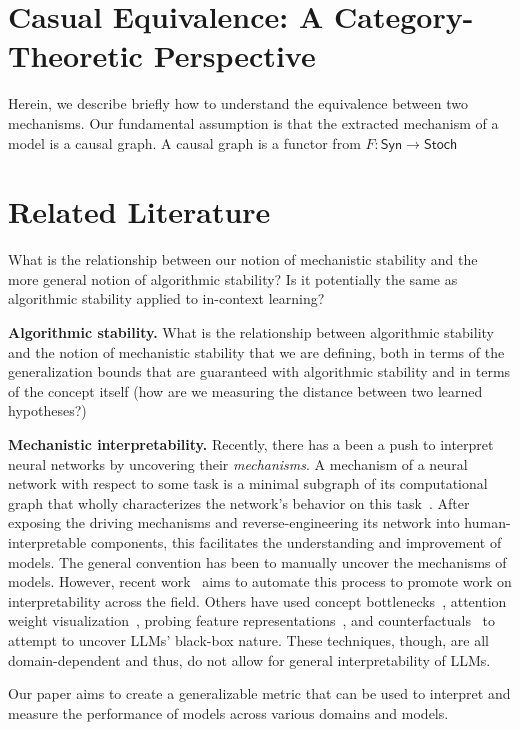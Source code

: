 \documentclass[10pt]{article}
\begin{document}
\section{Casual Equivalence: A Category-Theoretic Perspective}
Herein, we describe briefly how to understand the equivalence between two mechanisms.
Our fundamental assumption is that the extracted mechanism of a model is 
a causal graph.
A causal graph is a functor from $F: \textsf{Syn} \to \textsf{Stoch}$


\section{Related Literature}
What is the relationship between our notion of mechanistic stability and 
the more general notion of algorithmic stability? Is it potentially the same
as algorithmic stability applied to in-context learning?

\textbf{Algorithmic stability.} What is the relationship between algorithmic
stability and the notion of mechanistic stability that we are defining, both
in terms of the generalization bounds that are guaranteed with algorithmic
stability and in terms of the concept itself (how are we measuring
the distance between two learned hypotheses?)

\textbf{Mechanistic interpretability.} Recently, there has a been a push to interpret
neural networks by uncovering their
\textit{mechanisms}. A mechanism of a neural network with respect to some task
is a minimal subgraph of its computational graph that wholly characterizes the
network's behavior on this task~\citep{wang_interpretability_2022}. After exposing
the driving mechanisms and reverse-engineering its network into human-interpretable
components, this facilitates the understanding and improvement of models.  The general
convention has been to manually uncover the mechanisms of models. However, recent work~\citep{conmy_towards_2023}
aims to automate this process to promote work on interpretability across the field. Others 
have used concept bottlenecks~\citep{tan_interpreting_2023}, attention weight 
visualization~\citep{galassi_attention_2020}, probing feature representations~\citep{lundberg_a_2017}, and 
counterfactuals~\citep{wu_polyjuice_2021} to attempt to uncover LLMs' black-box nature. These techniques, 
though, are all domain-dependent and thus, do not allow for general interpretability of LLMs.

Our paper aims to create a generalizable metric that can be used to interpret and measure the performance 
of models across various domains and models.
\end{document}

